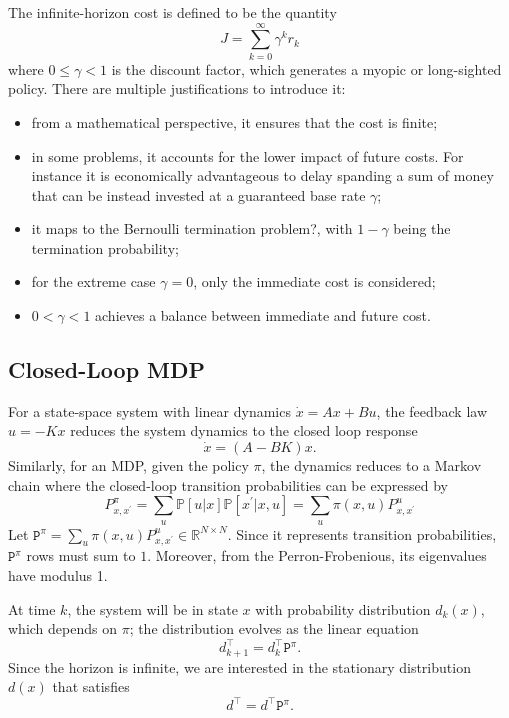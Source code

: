The infinite-horizon cost is defined to be the quantity
\begin{equation*}
  J = \sum_{k=0}^\infty \gamma^k r_k
\end{equation*}
where $0 \le \gamma < 1$ is the discount factor, which generates a myopic or long-sighted policy. There are multiple justifications to introduce it:
\begin{itemize}
\item from a mathematical perspective, it ensures that the cost is finite;
\item in some problems, it accounts for the lower impact of future costs. For instance it is economically advantageous to delay spanding a sum of money that can be instead invested at a guaranteed base rate $\gamma$;
\item it maps to the Bernoulli termination problem?, with $1-\gamma$ being the termination probability;
\item for the extreme case $\gamma = 0$, only the immediate cost is considered;
\item $0<\gamma <1$ achieves a balance between immediate and future cost.
\end{itemize}

\subsection{Closed-Loop MDP}

For a state-space system with linear dynamics $\dot{x} = Ax+Bu$, the feedback law $u=-Kx$ reduces the system dynamics to the closed loop response
\begin{equation*}
  \dot{x} = (A-BK)x.
\end{equation*}
Similarly, for an MDP, given the policy $\pi$, the dynamics reduces to a Markov chain where the closed-loop transition probabilities can be expressed by
\begin{equation*}
  P^\pi _{x,x^\prime} = \sum_u \mathbb{P}[u|x] \mathbb{P}[x^\prime|x,u] = \sum_u \pi(x,u) P_{x,x^\prime}^u
\end{equation*}
Let $\mathtt{P}^\pi = \sum_u \pi(x,u) P_{x,x^\prime}^u\in \mathbb{R}^{N\times N}$. Since it represents transition probabilities, $\mathtt{P}^\pi$ rows must sum to $1$. Moreover, from the Perron-Frobenious, its eigenvalues have modulus 1.

At time $k$, the system will be in state $x$ with probability distribution $d_k(x)$, which depends on $\pi$; the distribution evolves as the linear equation
\begin{equation*}
  d_{k+1}^\top = d_k^\top \mathtt{P}^\pi.
\end{equation*}
Since the horizon is infinite, we are interested in the stationary distribution $d(x)$ that satisfies
\begin{equation*}
  d^\top = d^\top \mathtt{P}^\pi.
\end{equation*}


